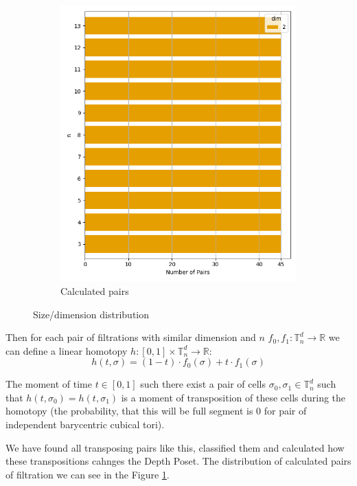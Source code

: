 \documentclass{article}
\begin{document}
\begin{figure}[htbp]
\begin{subfigure}[t]{0.45\textwidth}
        \includegraphics[width=\textwidth]{pics/torus-transpositions-extended/distribution.png}
        \caption{Calculated pairs}
        \label{fig:pairs_distribution}
    \end{subfigure}
    \caption{Size/dimension distribution}
    \label{fig:distribution}
\end{figure}

\par Then for each pair of filtrations with similar dimension and $n$ $f_0, f_1:\mathbb{T}^d_n \to \mathbb{R}$ we can define a linear homotopy $h: [0, 1]\times\mathbb{T}^d_n \to \mathbb{R}$:
$$
    h(t, \sigma) = (1 - t)\cdot f_0(\sigma) + t\cdot f_1(\sigma)
$$

\par The moment of time $t\in [0, 1]$ such there exist a pair of cells $\sigma_0, \sigma_1\in\mathbb{T}^d_n$ such that $h(t, \sigma_0) = h(t, \sigma_1)$ is a moment of transposition of these cells during the homotopy (the probability, that this will be full segment is 0 for pair of independent barycentric cubical tori).
\par We have found all transposing pairs like this, classified them and calculated how these transpositions cahnges the Depth Poset. The distribution of calculated pairs of filtration we can see in the Figure \ref{fig:pairs_distribution}.
\newpage
\end{document}
